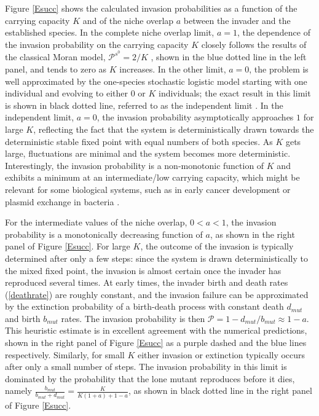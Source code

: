Figure \ref{Esucc} shows the calculated invasion probabilities as a function of the carrying capacity $K$ and of the niche overlap $a$ between the invader and the established species. 
In the complete niche overlap limit, $a=1$, the dependence of the invasion probability on the carrying capacity $K$ closely follows the results of the classical Moran model, $\mathcal{P}^{s^0}=2/K$ \cite{Moran1962}, shown in the blue dotted line in the left panel, and tends to zero as $K$ increases. 
In the other limit, $a=0$, the problem is well approximated by the one-species stochastic logistic model starting with one individual and evolving to either $0$ or $K$ individuals; the exact result in this limit is shown in black dotted line, referred to as the independent limit \cite{Nisbet1982}. 
In the independent limit, $a=0$, the invasion probability asymptotically approaches $1$ for large $K$, reflecting the fact that the system is deterministically drawn towards the deterministic stable fixed point with equal numbers of both species. 
As $K$ gets large, fluctuations are minimal and the system becomes more deterministic. 
Interestingly, the invasion probability is a non-monotonic function of $K$ and exhibits a minimum at an intermediate/low carrying capacity, which might be relevant for some biological systems, such as in early cancer development \cite{Ashcroft2015} or plasmid exchange in bacteria \cite{Gooding-townsend2015}.

For the intermediate values of the niche overlap, $0<a<1$, the invasion probability is a monotonically decreasing function of $a$, as shown in the right panel of Figure \ref{Esucc}. 
For large $K$, the outcome of the invasion is typically determined after only a few steps: since the system is drawn deterministically to the mixed fixed point, the invasion is almost certain once the invader has reproduced several times. 
At early times, the invader birth and death rates (\ref{deathrate}) are roughly constant, and the invasion failure can be approximated by the extinction probability of a birth-death process with constant death $d_{mut}$ and birth $b_{mut}$ rates. 
The invasion probability is then $\mathcal{P}=1- d_{mut}/b_{mut}\approx 1-a$. 
This heuristic estimate is in excellent agreement with the numerical predictions, shown in the right panel of Figure \ref{Esucc} as a purple dashed and the blue lines respectively.
Similarly, for small $K$ either invasion or extinction typically occurs after only a small number of steps. 
The invasion probability in this limit is dominated by the probability that the lone mutant reproduces before it dies, namely $\frac{b_{mut}}{b_{mut}+d_{mut}} = \frac{K}{K(1+a)+1-a}$, as shown in black dotted line in the right panel of Figure \ref{Esucc}.

